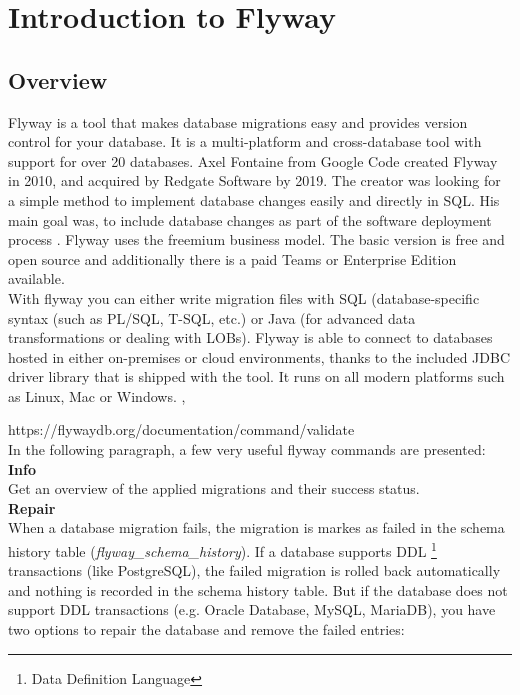 

\chapter{Introduction to Flyway}


\cite{Choudhry2018}

\section{Overview}
%
Flyway is a tool that makes database migrations easy and provides version control for your database. It is a multi-platform and cross-database tool with support for over 20 databases.
Axel Fontaine from Google Code created Flyway in 2010, and acquired by Redgate Software by 2019. The creator was looking for a simple method to implement database changes easily and directly in SQL. His main goal was, to include database changes as part of the software deployment process \cite{Robles2021}.
Flyway uses the freemium business model.  The basic version is free and open source \cite{Fontaine2010} and additionally there is a paid Teams or Enterprise Edition available.\\
With flyway you can either write migration files with SQL (database-specific syntax (such as PL/SQL, T-SQL, etc.) or Java (for advanced data transformations or dealing with LOBs). Flyway is able to connect to databases hosted in either on-premises or cloud environments, thanks to the included JDBC driver library that is shipped with the tool. It runs on all modern platforms such as Linux, Mac or Windows.  \cite{Dillon2022}, \cite{DBMSTools}




%
https://flywaydb.org/documentation/command/validate\\
In the following paragraph, a few very useful flyway commands are presented:\\

\textbf{Info}\\
Get an overview of the applied migrations and their success status.\\

\textbf{Repair}\\
When a database migration fails, the migration is markes as failed in the schema history table (\textit{flyway\_schema\_history}). If a database supports DDL \footnote{Data Definition Language} transactions (like PostgreSQL), the failed migration is rolled back automatically and nothing is recorded in the schema history table.  But if the database does not support DDL transactions (e.g. Oracle Database, MySQL, MariaDB), you have two options to repair the database and remove the failed entries:

